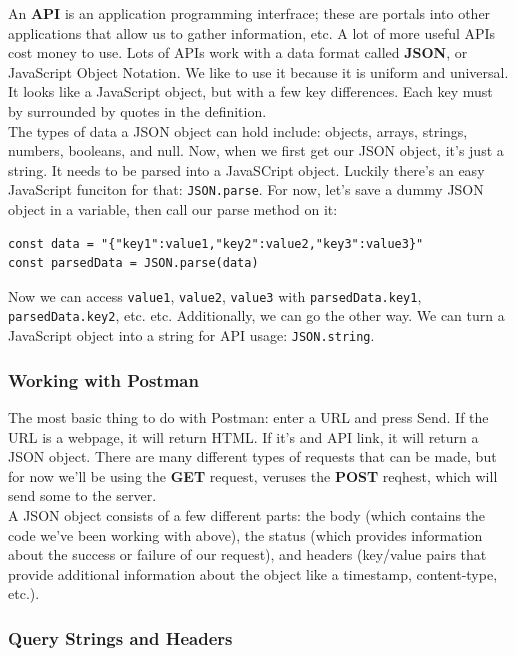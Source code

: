 \documentclass[11pt, letterpaper]{article}
\begin{document}
An \textbf{API} is an application programming interfrace; these are portals into other applications that allow us to
gather information, etc. A lot of more useful APIs cost money to use. Lots of APIs work with a data format called 
\textbf{JSON}, or JavaScript Object Notation. We like to use it because it is uniform and universal. It looks like
a JavaScript object, but with a few key differences. Each key must by surrounded by quotes in the definition. \\

The types of data a JSON object can hold include: objects, arrays, strings, numbers, booleans, and null.
Now, when we first get our JSON object, it's just a string. It needs to be parsed into a JavaSCript object. Luckily
there's an easy JavaScript funciton for that: \verb+JSON.parse+. For now, let's save a dummy JSON object in a variable,
then call our parse method on it:

\begin{verbatim}
const data = "{"key1":value1,"key2":value2,"key3":value3}"
const parsedData = JSON.parse(data)
\end{verbatim}

Now we can access \verb+value1+, \verb+value2+, \verb+value3+ with \verb+parsedData.key1+, \verb+parsedData.key2+, etc.
etc. Additionally, we can go the other way. We can turn a JavaScript object into a string for API usage:
\verb+JSON.string+. \\ 

\subsubsection*{Working with Postman}

The most basic thing to do with Postman: enter a URL and press Send. If the URL is a webpage, it will return HTML. If it's
and API link, it will return a JSON object. There are many different types of requests that can be made, but for now
we'll be using the \textbf{GET} request, veruses the \textbf{POST} reqhest, which will send some to the server. \\

A JSON object consists of a few different parts: the body (which contains the code we've been working with above),
the status (which provides information about the success or failure of our request), and headers (key/value pairs
that provide additional information about the object like a timestamp, content-type, etc.). 

\subsubsection*{Query Strings and Headers}
\end{document}
